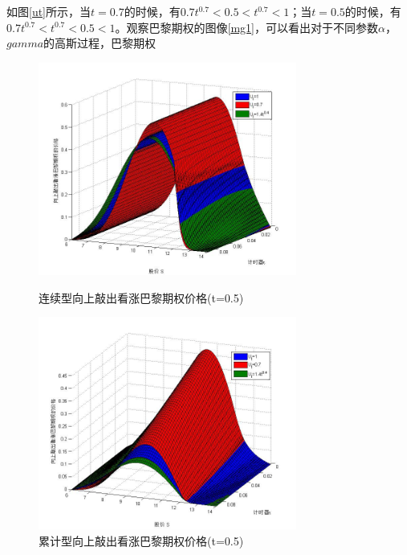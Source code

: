 \documentclass{ctexart} %
\begin{document}
如图\ref{ut}所示，当$t=0.7$的时候，有$0.7t^0.7<0.5<t^{0.7}<1$；当$t=0.5$的时候，有$0.7t^0.7<t^0.7<0.5<1$。观察巴黎期权的图像\ref{mg1}，可以看出对于不同参数$\alpha$，$gamma$的高斯过程，巴黎期权

\begin{figure}[H]
\begin{minipage}{0.48\linewidth}
\includegraphics[width=8.5cm]{code/mg2.jpg}
\caption{连续型向上敲出看涨巴黎期权价格(t=0.5)}
\end{minipage}
\begin{minipage}{0.48\linewidth}
\includegraphics[width=8.5cm]{code/mc2.jpg}
\caption{累计型向上敲出看涨巴黎期权价格(t=0.5)}
\end{minipage}
\end{figure}
\end{document}
